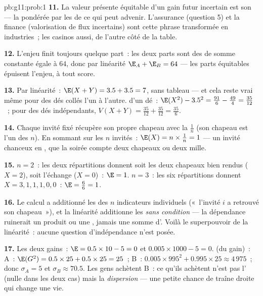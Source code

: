 \begin{solution}{pb:g11:prob:1}
\textbf{11.} La valeur présente équitable d'un gain futur incertain
est son  --- la  pondérée par les  de ce
qui peut advenir. L'assurance (question 5) et la finance
(valorisation de flux incertains) sont cette phrase transformée en
industries~; les casinos aussi, de l'autre côté de la table.

\textbf{12.} L'enjeu finit toujours quelque part~: les deux parts
sont des  de somme constante égale à $64$, donc
par linéarité $\E_A + \E_B = 64$ --- les parts équitables épuisent
l'enjeu, à tout score.

\textbf{13.} Par linéarité~: $\E(X + Y) = 3.5 + 3.5 = 7$, sans
tableau --- et cela reste vrai même pour des dés collés l'un à
l'autre.  d'un dé~:
$\E(X^2) - 3.5^2 = \frac{91}{6} - \frac{49}{4} = \frac{35}{12}$~;
pour des dés indépendants,
$V(X + Y) = \frac{35}{12} + \frac{35}{12} = \frac{35}{6}$.

\textbf{14.} Chaque invité fixé récupère son propre chapeau avec la
 $\frac1n$ (son chapeau est l'un des $n$). En sommant sur
les $n$ invités~: $\E(X) = n \times \frac1n = 1$ --- un invité
chanceux en , que la soirée compte deux chapeaux ou deux
mille.

\textbf{15.} $n = 2$~: les deux répartitions donnent soit les deux
chapeaux bien rendus ($X = 2$), soit l'échange ($X = 0$)~:
$\E = 1$. $n = 3$~: les six répartitions donnent
$X = 3, 1, 1, 1, 0, 0$~: $\E = \frac{6}{6} = 1$.

\textbf{16.} Le calcul a additionné les  des $n$
indicateurs individuels («~l'invité $i$ a retrouvé son chapeau~»),
et la linéarité additionne les  \emph{sans condition} ---
la dépendance ruinerait un produit ou une , jamais une somme
d'. Voilà le superpouvoir de la linéarité~: aucune
question d'indépendance n'est posée.

\textbf{17.} Les deux gains~: $\E = 0.5 \times 10 - 5 = 0$ et
$0.005 \times 1000 - 5 = 0$.  (du gain)~:
A~: $\E(G^2) = 0.5 \times 25 + 0.5 \times 25 = 25$~;
B~: $0.005 \times 995^2 + 0.995 \times 25 \approx 4\,975$~; donc
$\sigma_A = 5$ et $\sigma_B \approx 70.5$. Les gens achètent B~: ce
qu'ils achètent n'est pas l' (nulle dans les deux cas)
mais la \emph{dispersion} --- une petite chance de traîne droite qui
change une vie.


\end{solution}
